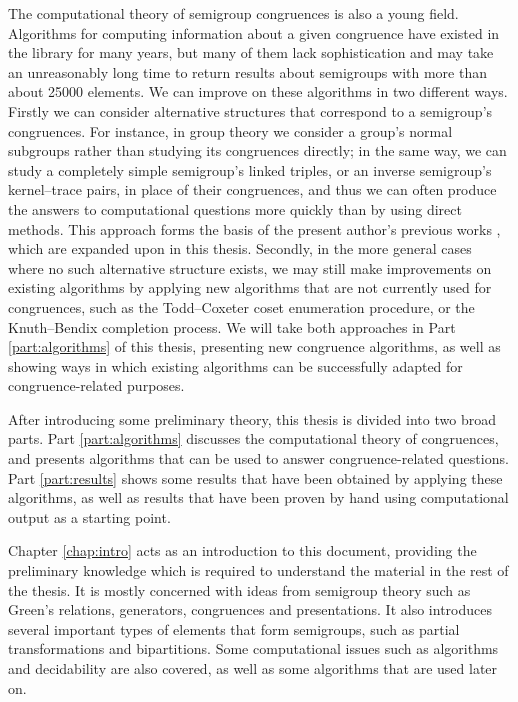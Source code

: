 The computational theory of semigroup congruences is also a young field.
Algorithms for computing information about a given congruence have existed in
the \GAP{} library for many years, but many of them lack sophistication and may
take an unreasonably long time to return results about semigroups with more than
about 25000 elements.  We can improve on these algorithms in two different ways.
Firstly we can consider alternative structures that correspond to a semigroup's
congruences.  For instance, in group theory we consider a group's normal
subgroups rather than studying its congruences directly; in the same way, we can
study a completely simple semigroup's linked triples, or an inverse semigroup's
kernel--trace pairs, in place of their congruences, and thus we can often
produce the answers to computational questions more quickly than by using direct
methods.  This approach forms the basis of the present author's previous works
\cite{mtorpey_pre_msc, mtorpey_msc}, which are expanded upon in this
thesis. Secondly, in the more general cases where no such alternative structure
exists, we may still make improvements on existing algorithms by applying new
algorithms that are not currently used for congruences, such as the
Todd--Coxeter coset enumeration procedure, or the Knuth--Bendix completion
process.  We will take both approaches in Part \ref{part:algorithms} of this
thesis, presenting new congruence algorithms, as well as showing ways in which
existing algorithms can be successfully adapted for congruence-related purposes.

After introducing some preliminary theory, this thesis is divided into two broad
parts.  Part \ref{part:algorithms} discusses the computational theory of
congruences, and presents algorithms that can be used to answer
congruence-related questions.  Part \ref{part:results} shows some results that
have been obtained by applying these algorithms, as well as results that have
been proven by hand using computational output as a starting point.

Chapter \ref{chap:intro} acts as an introduction to this document, providing the
preliminary knowledge which is required to understand the material in the rest
of the thesis.  It is mostly concerned with ideas from semigroup theory such as
Green's relations, generators, congruences and presentations.  It also
introduces several important types of elements that form semigroups, such as
partial transformations and bipartitions.  Some computational issues such as
algorithms and decidability are also covered, as well as some algorithms that
are used later on.

